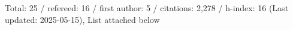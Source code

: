 Total: 25 / refereed: 16 / first author: 5 / citations: 2,278 / h-index: 16 (Last updated: 2025-05-15), List attached below